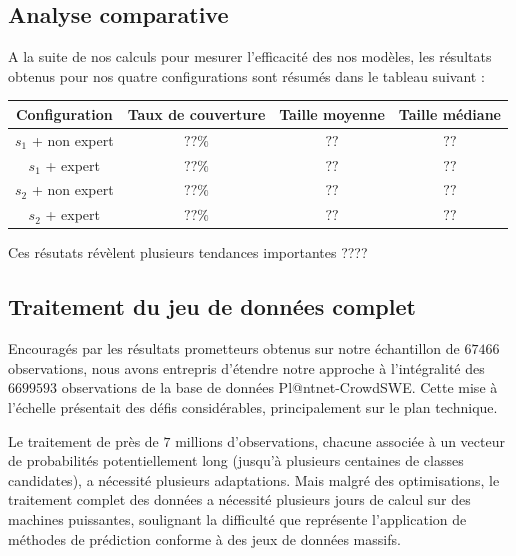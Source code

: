 \documentclass[a4paper,12pt]{article}
\begin{document}
\subsection{Analyse comparative}

A la suite de nos calculs pour mesurer l'efficacité des nos modèles, les résultats obtenus pour nos quatre configurations sont résumés dans le tableau suivant :

\begin{center}
\begin{tabular}{|c|c|c|c|}
    \hline
    Configuration & Taux de couverture & Taille moyenne & Taille médiane \\
    \hline
    $s_1$ + non expert & $??\%$ & $??$ & $??$ \\
    $s_1$ + expert & $??\%$ & $??$ & $??$ \\
    $s_2$ + non expert & $??\%$ & $??$ & $??$ \\
    $s_2$ + expert & $??\%$ & $??$ & $??$ \\
    \hline
    \end{tabular}
\end{center}
    
Ces résutats révèlent plusieurs tendances importantes ????

\subsection{Traitement du jeu de données complet}

Encouragés par les résultats prometteurs obtenus sur notre échantillon de $\num{67 466}$ observations, nous avons entrepris d'étendre notre approche à l'intégralité des $\num{6 699 593}$ observations de la base de données Pl@ntnet-CrowdSWE. Cette mise à l'échelle présentait des défis considérables, principalement sur le plan technique.

\vspace{0.2cm}

Le traitement de près de $7$ millions d'observations, chacune associée à un vecteur de probabilités potentiellement long (jusqu'à plusieurs centaines de classes candidates), a nécessité plusieurs adaptations. Mais malgré des optimisations, le traitement complet des données a nécessité plusieurs jours de calcul sur des machines puissantes, soulignant la difficulté que représente l'application de méthodes de prédiction conforme à des jeux de données massifs.

\vspace{0.2cm}
\end{document}
